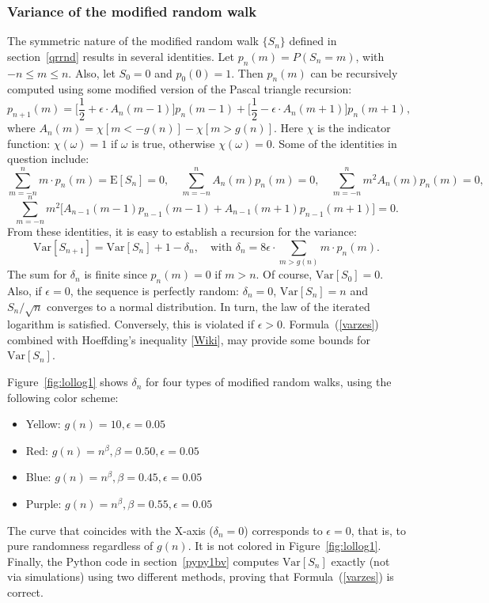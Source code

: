 \documentclass[oneside,10pt]{book}
\begin{document}
\subsubsection{Variance of the modified random walk}

The symmetric nature of the modified random walk $\{S_n\}$ defined in section~\ref{qrrnd} results in several
identities.  Let $p_n(m)=P(S_n=m)$, with $-n\leq m \leq n$. Also, let $S_0=0$ and $p_0(0)=1$. Then $p_n(m)$ can be recursively computed using some modified version of the Pascal triangle recursion:
\begin{equation}
p_{n+1}(m)=\Big[\frac{1}{2}+\epsilon \cdot A_n(m-1)\Big]p_n(m-1)+\Big[\frac{1}{2}-\epsilon\cdot A_n(m+1)\Big]p_n(m+1),\label{zxzdc}
\end{equation}
where $A_n(m)=\chi[m<-g(n)]-\chi[m>g(n)]$. Here $\chi$ is the indicator function: $\chi(\omega)=1$ if $\omega$ is true, otherwise $\chi(\omega)=0$.
Some of the identities in question include:
$$
\sum_{m=-n}^n m \cdot p_n(m)=\text{E}[S_n]=0,\quad
\sum_{m=-n}^n A_n(m)p_n(m)=0,\quad
\sum_{m=-n}^n m^2 A_n(m)p_n(m)=0,
$$
$$
\sum_{m=-n}^n m^2 \Big[A_{n-1}(m-1)p_{n-1}(m-1)+A_{n-1}(m+1)p_{n-1}(m+1)\Big]=0.
$$
From these identities, it is easy to establish a recursion for the variance:
\begin{equation}
\text{Var}[S_{n+1}]=\text{Var}[S_n]+1-\delta_n, \quad \text{with }\delta_n=8\epsilon\cdot \sum_{m>g(n)} m \cdot p_n(m).\label{varzes}
\end{equation}
The sum for $\delta_n$ is finite since $p_n(m)=0$ if $m>n$.   Of course,
$\text{Var}[S_0]=0$. Also, if $\epsilon=0$, the sequence is perfectly random: $\delta_n=0$, $\text{Var}[S_n]=n$ and
 $S_n/\sqrt{n}$ converges to a normal distribution. In turn, the law of the iterated logarithm is satisfied. Conversely,
 this is violated if $\epsilon>0$. Formula~(\ref{varzes})
 combined with \textcolor{index}{Hoeffding's inequality} [\href{https://en.wikipedia.org/wiki/Hoeffding\%27s_inequality}{Wiki}], may
 provide some bounds for $\text{Var}[S_n]$.

\noindent Figure~\ref{fig:lollog1} shows $\delta_n$ for four types of modified random walks, using the following color scheme:
\begin{itemize}
\item Yellow: $g(n)=10,\epsilon=0.05$
\item Red: $g(n)=n^\beta,\beta=0.50, \epsilon=0.05$
\item Blue: $g(n)=n^\beta,\beta=0.45, \epsilon=0.05$
\item Purple: $g(n)=n^\beta,\beta=0.55, \epsilon=0.05$
\end{itemize}
The curve that coincides with the X-axis ($\delta_n = 0$) corresponds to $\epsilon=0$, that is, to  pure randomness regardless of $g(n)$. It is not
 colored in Figure~\ref{fig:lollog1}. Finally, the Python code in section~\ref{pypy1bv} computes $\text{Var}[S_n]$ exactly (not via simulations) using two different methods, proving that
 Formula~(\ref{varzes}) is correct.
\end{document}
